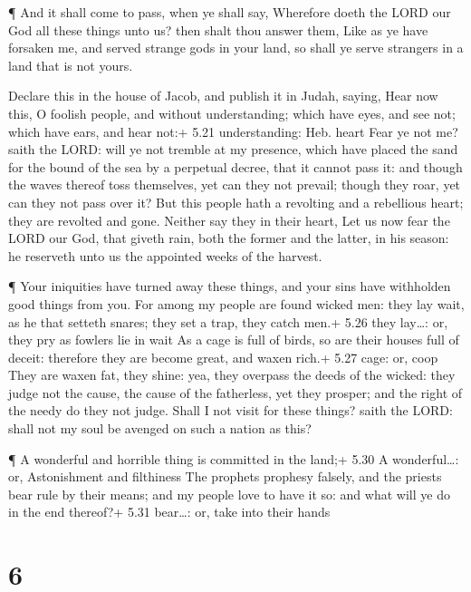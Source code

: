  ¶ And it shall come to pass, when ye shall say, Wherefore
doeth the LORD our God all these things unto us? then shalt thou answer
them, Like as ye have forsaken me, and served strange gods in your land,
so shall ye serve strangers in a land that is not yours.

 Declare this in the house of Jacob, and publish it in
Judah, saying,  Hear now this, O foolish people, and
without understanding; which have eyes, and see not; which have ears,
and hear not:+ 5.21 understanding: Heb. heart  Fear ye not
me? saith the LORD: will ye not tremble at my presence, which have
placed the sand for the bound of the sea by a perpetual decree, that it
cannot pass it: and though the waves thereof toss themselves, yet can
they not prevail; though they roar, yet can they not pass over it?
 But this people hath a revolting and a rebellious heart;
they are revolted and gone.  Neither say they in their
heart, Let us now fear the LORD our God, that giveth rain, both the
former and the latter, in his season: he reserveth unto us the appointed
weeks of the harvest.

 ¶ Your iniquities have turned away these things, and your
sins have withholden good things from you.  For among my
people are found wicked men: they lay wait, as he that setteth snares;
they set a trap, they catch men.+ 5.26 they lay\ldots: or, they pry as
fowlers lie in wait  As a cage is full of birds, so are
their houses full of deceit: therefore they are become great, and waxen
rich.+ 5.27 cage: or, coop  They are waxen fat, they shine:
yea, they overpass the deeds of the wicked: they judge not the cause,
the cause of the fatherless, yet they prosper; and the right of the
needy do they not judge.  Shall I not visit for these
things? saith the LORD: shall not my soul be avenged on such a nation as
this?

 ¶ A wonderful and horrible thing is committed in the
land;+ 5.30 A wonderful\ldots: or, Astonishment and filthiness
 The prophets prophesy falsely, and the priests bear rule
by their means; and my people love to have it so: and what will ye do in
the end thereof?+ 5.31 bear\ldots: or, take into their hands

\hypertarget{section-5}{%
\section{6}\label{section-5}}

